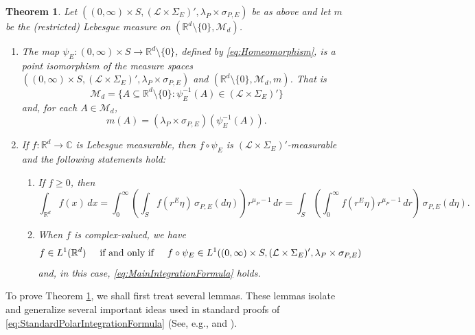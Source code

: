 \documentclass[11pt]{article}
\newtheorem{theorem}{Theorem}[section]
\theoremstyle{remark}
\begin{document}
\begin{theorem}\label{thm:MainIntegrationFormula}
Let $((0,\infty)\times S,(\mathcal{L}\times\Sigma_E)',\lambda_P\times\sigma_{P,E})$ be as above and let $m$ be the (restricted) Lebesgue measure on $(\mathbb{R}^d\setminus\{0\},\mathcal{M}_d)$.
\begin{enumerate}
\item\label{item:MainIntegrationFormula1} The map $\psi_E: (0,\infty)\times S\to\mathbb{R}^d\setminus\{0\}$, defined by \eqref{eq:Homeomorphism}, is a point isomorphism of the measure spaces $((0,\infty)\times S,(\mathcal{L}\times\Sigma_E)',\lambda_P\times\sigma_{P,E})$ and $(\mathbb{R}^d\setminus\{0\},\mathcal{M}_d,m)$. That is
\begin{equation*}
\mathcal{M}_d=\{A\subseteq \mathbb{R}^d\setminus\{0\}:\psi_E^{-1}(A)\in(\mathcal{L}\times\Sigma_E)'\}
\end{equation*}
and, for each $A\in\mathcal{M}_d$,
\begin{equation*}
m(A)=(\lambda_P\times\sigma_{P,E})(\psi_E^{-1}(A)).
\end{equation*}
\item\label{item:MainintegrationFormula2} If $f:\mathbb{R}^d\to\mathbb{C}$ is Lebesgue measurable, then $f\circ \psi_E$ is $(\mathcal{L}\times\Sigma_E)'$-measurable and the following statements hold:
\begin{enumerate}
\item If $f\geq 0$, then
\begin{equation}\label{eq:MainIntegrationFormula}
\int_{\mathbb{R}^d}f(x)\,dx=\int_0^\infty\left(\int_S f(r^E\eta)\,\sigma_{P,E}(d\eta)\right)r^{\mu_P-1}\,dr=\int_S\left(\int_0^\infty f(r^E\eta)r^{\mu_P-1}\,dr\right)\,\sigma_{P,E}(d\eta).
\end{equation}
\item When $f$ is complex-valued, we have 
\begin{equation*}f\in L^1(\mathbb{R}^d)\hspace{.5cm}\mbox{if and only if}\hspace{0.5cm}f\circ\psi_E\in L^1((0,\infty)\times S,(\mathcal{L}\times \Sigma_E)',\lambda_P\times\sigma_{P,E})
\end{equation*}
and, in this case, \eqref{eq:MainIntegrationFormula} holds.
\end{enumerate}
\end{enumerate}
\end{theorem}

\noindent To prove Theorem \ref{thm:MainIntegrationFormula}, we shall first treat several lemmas. These lemmas isolate and generalize several important ideas used in standard proofs of \eqref{eq:StandardPolarIntegrationFormula} (See, e.g., \cite{Folland1984} and \cite{Stein2005}). 
\end{document}
